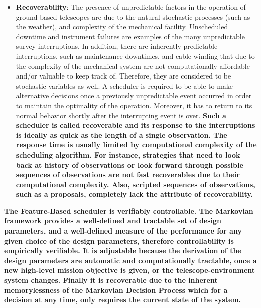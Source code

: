 \documentclass[12pt]{aastex62}
\theoremstyle{definition}
\begin{document}
\begin{itemize}
\item \textbf{Recoverability}: The presence of unpredictable factors in the operation of ground-based telescopes are due to the natural stochastic processes (such as the weather), and complexity of the mechanical facility. Unscheduled downtime and instrument failures are examples of the many unpredictable survey interruptions. In addition, there are inherently predictable interruptions, such as maintenance downtimes, and cable winding that due to the complexity of the mechanical system are not computationally affordable and/or valuable to keep track of. Therefore, they are considered to be stochastic variables as well. A scheduler is required to be able to make alternative decisions once a previously unpredictable event occurred in order to maintain the optimality of the operation. Moreover, it has to return to its normal behavior shortly after the interrupting event is over. {\bf Such a scheduler is called recoverable and its response to the interruptions is ideally as quick as the length of a single observation. The response time is usually limited by computational complexity of the scheduling algorithm. For instance, strategies that need to look back at history of observations or look forward through possible sequences of observations are not fast recoverables due to their computational complexity. Also, scripted sequences of observations, such as a proposals, completely lack the attribute of recoverability.\bf}
\end{itemize}

{\bf The Feature-Based scheduler is verifiably controllable. The Markovian framework provides a well-defined and tractable set of design parameters, and a well-defined measure of the performance for any given choice of the design parameters, therefore controllability is empirically verifiable. It is adjustable because the derivation of the design parameters are automatic and computationally tractable, once a new high-level mission objective is given, or the telescope-environment system changes. Finally it is recoverable due to the inherent memorylessness of the Markovian Decision Process which for a decision at any time, only requires the current state of the system.\bf}
\end{document}
